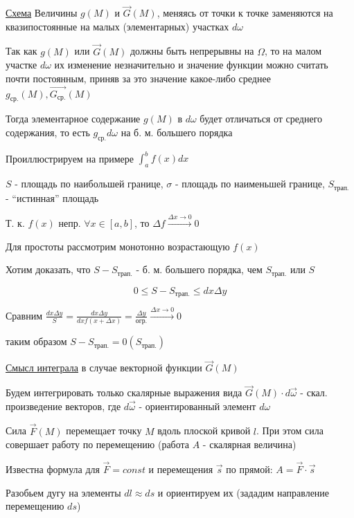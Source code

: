 \documentclass[12pt]{article}
\begin{document}
    \underline{Схема} Величины $g(M)$ и $\overrightarrow{G}(M)$, меняясь от точки к точке заменяются на квазипостоянные на малых (элементарных) участках $d\omega$

    Так как $g(M)$ или $\overrightarrow{G}(M)$ должны быть непрерывны на $\Omega$, то на малом участке $d\omega$ их изменение незначительно и
    значение функции можно считать почти постоянным, приняв за это значение какое-либо среднее $g_{\text{ср.}}(M), \overrightarrow{G_{\text{ср.}}}(M)$

    Тогда элементарное содержание $g(M)$ в $d\omega$ будет отличаться от среднего содержания, то есть $g_{\text{ср.}}d\omega$ на б. м. большего порядка

    \Ex Проиллюстрируем на примере $\int_a^b f(x) dx$

    $S$ - площадь по наибольшей границе, $\sigma$ - площадь по наименьшей границе, $S_{\text{трап.}}$ - \enquote{истинная} площадь

    Т. к. $f(x)$ непр. $\forall x \in [a, b]$, то $\Delta f \stackrel{\Delta x \to 0}{\rightarrow} 0$

    Для простоты рассмотрим монотонно возрастающую $f(x)$

    Хотим доказать, что $S - S_{\text{трап.}}$ - б. м. большего порядка, чем $S_{\text{трап.}}$ или $S$

    \[0 \leq S - S_{\text{трап.}} \leq dx \Delta y\]

    Сравним $\frac{dx \Delta y}{S} = \frac{dx \Delta y}{dx f(x + \Delta x)} = \frac{\Delta y}{\text{огр.}} \stackrel{\Delta x \to 0}{\rightarrow} 0$

    таким образом $S - S_{\text{трап.}} = 0 (S_{\text{трап.}})$

    \underline{Смысл интеграла} в случае векторной функции $\overrightarrow{G}(M)$

    Будем интегрировать только скалярные выражения вида $\overrightarrow{G}(M) \cdot d\overrightarrow{\omega}$ - скал. произведение векторов,
    где $d\overrightarrow{\omega}$ - ориентированный элемент $d\omega$

    \Ex Сила $\overrightarrow{F}(M)$ перемещает точку $M$ вдоль плоской кривой $l$. При этом сила совершает работу по перемещению
    (работа $A$ - скалярная величина)

    Известна формула для $\overrightarrow{F} = const$ и перемещения $\overrightarrow{s}$ по прямой: $A = \overrightarrow{F} \cdot \overrightarrow{s}$

    Разобьем дугу на элементы $dl \approx ds$ и ориентируем их (зададим направление перемещению $ds$)
\end{document}
